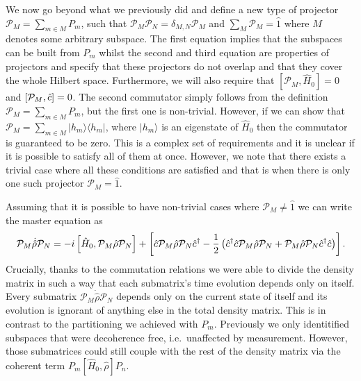We now go beyond what we previously did and define a new type of
projector $\mathcal{P}_M = \sum_{m \in M} P_m$, such that
$\mathcal{P}_M \mathcal{P}_N = \delta_{M,N} \mathcal{P}_M$ and
$\sum_M \mathcal{P}_M = \hat{1}$ where $M$ denotes some arbitrary
subspace. The first equation implies that the subspaces can be built
from $P_m$ whilst the second and third equation are properties of
projectors and specify that these projectors do not overlap and that
they cover the whole Hilbert space. Furthermore, we will also require
that $[\mathcal{P}_M, \hat{H}_0 ] = 0$ and $[\mathcal{P}_M, \hat{c}] =
0$. The second commutator simply follows from the definition
$\mathcal{P}_M = \sum_{m \in M} P_m$, but the first one is
non-trivial. However, if we can show that
$\mathcal{P}_M = \sum_{m \in M} | h_m \rangle \langle h_m |$, where
$| h_m \rangle$ is an eigenstate of $\hat{H}_0$ then the commutator is
guaranteed to be zero. This is a complex set of requirements and it is
unclear if it is possible to satisfy all of them at once. However, we
note that there exists a trivial case where all these conditions are
satisfied and that is when there is only one such projector
$\mathcal{P}_M = \hat{1}$.

Assuming that it is possible to have non-trivial cases where
$\mathcal{P}_M \ne \hat{1}$ we can write the master equation as
\begin{equation} 
  \label{eq:bigP}
  \mathcal{P}_M \dot{\hat{\rho}} \mathcal{P}_N = -i
  \left[\hat{H}_0, \mathcal{P}_M \hat{\rho} \mathcal{P}_N \right] +
  \left[ \hat{c} \mathcal{P}_M \hat{\rho}
  \mathcal{P}_N \hat{c}^\dagger - \frac{1}{2} \left( \hat{c}^\dagger \hat{c} \mathcal{P}_M \hat{\rho}
  \mathcal{P}_N + \mathcal{P}_M \hat{\rho} \mathcal{P}_N \hat{c}^\dagger \hat{c} \right)
  \right].
\end{equation} 
Crucially, thanks to the commutation relations we were able to divide
the density matrix in such a way that each submatrix's time evolution
depends only on itself. Every submatrix
$\mathcal{P}_M \dot{\hat{\rho}} \mathcal{P}_N$ depends only on the
current state of itself and its evolution is ignorant of anything else
in the total density matrix. This is in contrast to the partitioning
we achieved with $P_m$. Previously we only identitified subspaces that
were decoherence free, i.e.~unaffected by measurement. However, those
submatrices could still couple with the rest of the density matrix via
the coherent term $P_m [\hat{H}_0, \hat{\rho}] P_n$.

